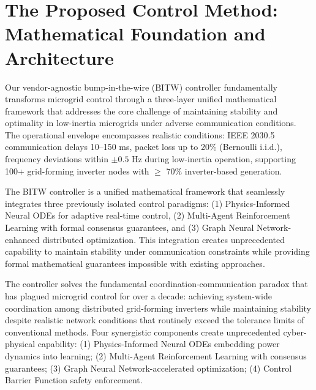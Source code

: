 \documentclass[12pt]{article}
\begin{document}
\section{The Proposed Control Method: Mathematical Foundation and Architecture}
\vspace{-0.5cm}
Our vendor-agnostic bump-in-the-wire (BITW) controller fundamentally transforms microgrid control through a three-layer unified mathematical framework that addresses the core challenge of maintaining stability and optimality in low-inertia microgrids under adverse communication conditions. The operational envelope encompasses realistic conditions: IEEE 2030.5 communication delays 10--150 ms, packet loss up to 20\% (Bernoulli i.i.d.), frequency deviations within $\pm 0.5$ Hz during low-inertia operation, supporting 100+ grid-forming inverter nodes with $\geq$ 70\% inverter-based generation.

The BITW controller is a unified mathematical framework that seamlessly integrates three previously isolated control paradigms: (1) Physics-Informed Neural ODEs for adaptive real-time control, (2) Multi-Agent Reinforcement Learning with formal consensus guarantees, and (3) Graph Neural Network-enhanced distributed optimization. This integration creates unprecedented capability to maintain stability under communication constraints while providing formal mathematical guarantees impossible with existing approaches.

The controller solves the fundamental coordination-communication paradox that has plagued microgrid control for over a decade: achieving system-wide coordination among distributed grid-forming inverters while maintaining stability despite realistic network conditions that routinely exceed the tolerance limits of conventional methods. Four synergistic components create unprecedented cyber-physical capability: (1) Physics-Informed Neural ODEs embedding power dynamics into learning; (2) Multi-Agent Reinforcement Learning with consensus guarantees; (3) Graph Neural Network-accelerated optimization; (4) Control Barrier Function safety enforcement.
\end{document}
